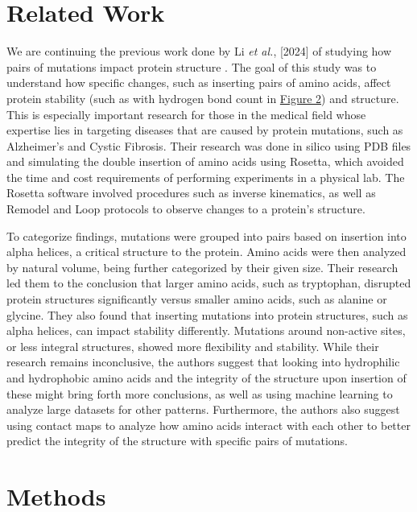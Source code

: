 \documentclass[sigconf, screen, authorversion, authoraddress=false, oneside]{acmart}
\begin{document}
\section{Related Work}
We are continuing the previous work done by Li \textit{et al.}, [2024] of studying how pairs of mutations impact protein structure \cite{ArunanDesirajuKleinSadlejScheinerAlkortaClaryCrabtreeDannenbergHobzaKjaergaardLegonMennucciNesbitt+2011+1619+1636}. The goal of this study was to understand how specific changes, such as inserting pairs of amino acids, affect protein stability (such as with hydrogen bond count in \hyperref[fig:Figure2]{Figure 2}) and structure. This is especially important research for those in the medical field whose expertise lies in targeting diseases that are caused by protein mutations, such as Alzheimer’s and Cystic Fibrosis. Their research was done in silico using PDB files and simulating the double insertion of amino acids using Rosetta, which avoided the time and cost requirements of performing experiments in a physical lab. The Rosetta software involved procedures such as inverse kinematics, as well as Remodel and Loop protocols to observe changes to a protein’s structure.  

To categorize findings, mutations were grouped into pairs based on insertion into alpha helices, a critical structure to the protein. Amino acids were then analyzed by natural volume, being further categorized by their given size. Their research led them to the conclusion that larger amino acids, such as tryptophan, disrupted protein structures significantly versus smaller amino acids, such as alanine or glycine. They also found that inserting mutations into protein structures, such as alpha helices, can impact stability differently. Mutations around non-active sites, or less integral structures, showed more flexibility and stability. While their research remains inconclusive, the authors suggest that looking into hydrophilic and hydrophobic amino acids and the integrity of the structure upon insertion of these might bring forth more conclusions, as well as using machine learning to analyze large datasets for other patterns. Furthermore, the authors also suggest using contact maps to analyze how amino acids interact with each other to better predict the integrity of the structure with specific pairs of mutations.


\section{Methods}
\end{document}
